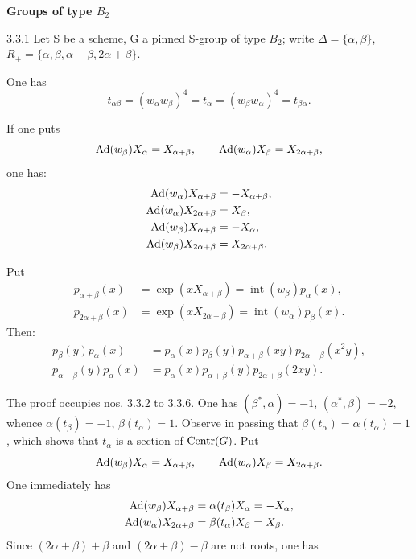 \textbf{Groups of type $B_2$}
\begin{proposition}{3.3.1}\label{XXIII.3.3.1}
Let S be a scheme, G a pinned S-group of type $B_2$; write $\Delta=\{\alpha,\beta\}$, $R_+=\{\alpha,\beta,\alpha+\beta,2\alpha+\beta\}$.
\begin{enumeratei}
\item One has
\[
t_{\alpha\beta}=(w_\alpha w_\beta)^4=t_\alpha=(w_\beta w_\alpha)^4=t_{\beta\alpha}.
\]
\item If one puts
\[
\operatorname{Ad}(w_\beta)X_\alpha=X_{\alpha+\beta},\qquad\operatorname{Ad}(w_\alpha)X_\beta=X_{2\alpha+\beta},
\]
one has:
\[
\begin{aligned}
\operatorname{Ad}(w_\alpha)X_{\alpha+\beta}&=-X_{\alpha+\beta},\\
\operatorname{Ad}(w_\alpha)X_{2\alpha+\beta}&=X_\beta,\\
\operatorname{Ad}(w_\beta)X_{\alpha+\beta}&=-X_\alpha,\\
\operatorname{Ad}(w_\beta)X_{2\alpha+\beta}&=X_{2\alpha+\beta}.
\end{aligned}
\]
\item Put
\[
\begin{aligned}
p_{\alpha+\beta}(x)&=\exp(xX_{\alpha+\beta})=\operatorname{int}(w_\beta)p_\alpha(x),\\
p_{2\alpha+\beta}(x)&=\exp(xX_{2\alpha+\beta})=\operatorname{int}(w_\alpha)p_\beta(x).
\end{aligned}
\]
Then:
\[
\begin{aligned}
p_\beta(y)p_\alpha(x)&=p_\alpha(x)p_\beta(y)p_{\alpha+\beta}(xy)p_{2\alpha+\beta}(x^2y),\\
p_{\alpha+\beta}(y)p_\alpha(x)&=p_\alpha(x)p_{\alpha+\beta}(y)p_{2\alpha+\beta}(2xy).
\end{aligned}
\]
\end{enumeratei}
\end{proposition}
The proof occupies nos. 3.3.2 to 3.3.6. One has $(\beta^*,\alpha)=-1$, $(\alpha^*,\beta)=-2$, whence $\alpha(t_\beta)=-1$, $\beta(t_\alpha)=1$. Observe in passing that $\beta(t_\alpha)=\alpha(t_\alpha)=1$, which shows that $t_\alpha$ is a section of $\operatorname{Centr}(G)$. Put
\[
\operatorname{Ad}(w_\beta)X_\alpha=X_{\alpha+\beta},\qquad\operatorname{Ad}(w_\alpha)X_\beta=X_{2\alpha+\beta}.
\]
One immediately has
\[
\begin{aligned}
\operatorname{Ad}(w_\beta)X_{\alpha+\beta}&=\alpha(t_\beta)X_\alpha=-X_\alpha,\\
\operatorname{Ad}(w_\alpha)X_{2\alpha+\beta}&=\beta(t_\alpha)X_\beta=X_\beta.
\end{aligned}
\]
Since $(2\alpha+\beta)+\beta$ and $(2\alpha+\beta)-\beta$ are not roots, one has
